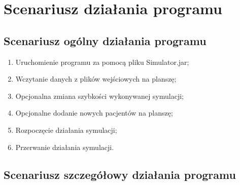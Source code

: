 \documentclass{article}
\begin{document}
\section{Scenariusz działania programu}

    \subsection{Scenariusz ogólny działania programu}
    \begin{enumerate}
      \item Uruchomienie programu za pomocą pliku Simulator.jar;
      \item Wczytanie danych z plików wejściowych na planszę;
      \item Opcjonalna zmiana szybkości wykonywanej symulacji;
      \item Opcjonalne dodanie nowych pacjentów na planszę;
      \item Rozpoczęcie działania symulacji;
      \item Przerwanie działania symulacji.
    \end{enumerate}

    \subsection{Scenariusz szczegółowy działania programu}
\end{document}
